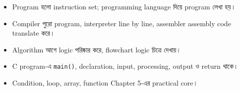 \begin{recapbox}
\begin{itemize}
\item Program হলো instruction set; programming language দিয়ে program লেখা হয়।
\item Compiler পুরো program, interpreter line by line, assembler assembly code translate করে।
\item Algorithm আগে logic পরিষ্কার করে, flowchart logic চিত্রে দেখায়।
\item C program-এ \texttt{main()}, declaration, input, processing, output ও return থাকে।
\item Condition, loop, array, function Chapter 5-এর practical core।
\end{itemize}
\end{recapbox}

